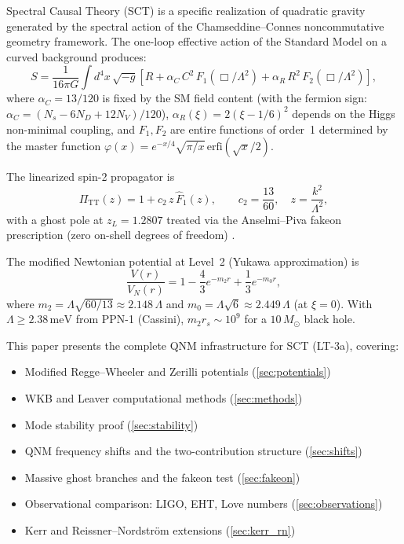 \documentclass[11pt,a4paper]{article}
\newcommand{\PiTT}{\Pi_{\mathrm{TT}}}
\newcommand{\Fhat}{\hat{F}}
\newcommand{\Msun}{M_\odot}
\begin{document}
Spectral Causal Theory (SCT) is a specific realization of quadratic gravity
generated by the spectral action of the Chamseddine--Connes noncommutative
geometry framework. The one-loop effective action of the Standard Model
on a curved background produces:
\begin{equation}\label{eq:action}
S = \frac{1}{16\pi G}\int d^4x\,\sqrt{-g}\left[
R + \alpha_C\, C^2\, F_1(\Box/\Lambda^2)
+ \alpha_R\, R^2\, F_2(\Box/\Lambda^2)
\right],
\end{equation}
where $\alpha_C = 13/120$ is fixed by the SM field content
(with the fermion sign: $\alpha_C = (N_s - 6N_D + 12N_V)/120$),
$\alpha_R(\xi) = 2(\xi - 1/6)^2$ depends on the Higgs non-minimal coupling,
and $F_1, F_2$ are entire functions of order~1 determined by the
master function $\varphi(x) = e^{-x/4}\sqrt{\pi/x}\,\mathrm{erfi}(\sqrt{x}/2)$.

The linearized spin-2 propagator is
\begin{equation}\label{eq:propagator}
\PiTT(z) = 1 + c_2\, z\, \Fhat_1(z), \qquad
c_2 = \frac{13}{60}, \quad z = \frac{k^2}{\Lambda^2},
\end{equation}
with a ghost pole at $z_L = 1.2807$ treated via the Anselmi--Piva
fakeon prescription (zero on-shell degrees of freedom) \cite{Anselmi:2017}.

The modified Newtonian potential at Level~2 (Yukawa approximation) is
\begin{equation}\label{eq:potential}
\frac{V(r)}{V_N(r)} = 1 - \frac{4}{3}e^{-m_2 r} + \frac{1}{3}e^{-m_0 r},
\end{equation}
where $m_2 = \Lambda\sqrt{60/13} \approx 2.148\,\Lambda$ and
$m_0 = \Lambda\sqrt{6} \approx 2.449\,\Lambda$ (at $\xi = 0$).
With $\Lambda \geq 2.38\,\mathrm{meV}$ from PPN-1 (Cassini),
$m_2 r_s \sim 10^9$ for a $10\,\Msun$ black hole.

This paper presents the complete QNM infrastructure for SCT (LT-3a),
covering:
\begin{itemize}
\item Modified Regge--Wheeler and Zerilli potentials (\cref{sec:potentials})
\item WKB and Leaver computational methods (\cref{sec:methods})
\item Mode stability proof (\cref{sec:stability})
\item QNM frequency shifts and the two-contribution structure (\cref{sec:shifts})
\item Massive ghost branches and the fakeon test (\cref{sec:fakeon})
\item Observational comparison: LIGO, EHT, Love numbers (\cref{sec:observations})
\item Kerr and Reissner--Nordstr\"om extensions (\cref{sec:kerr_rn})
\end{itemize}
\end{document}

